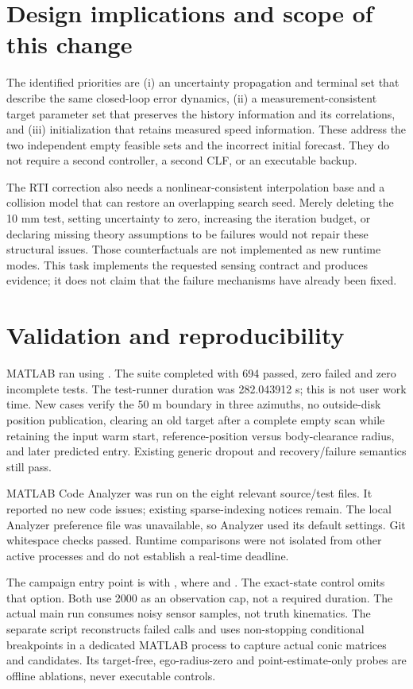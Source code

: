 \documentclass[11pt]{article}
\begin{document}
\section{Design implications and scope of this change}
The identified priorities are (i) an uncertainty propagation and terminal set
that describe the same closed-loop error dynamics, (ii) a measurement-consistent
target parameter set that preserves the history information and its correlations,
and (iii) initialization that retains measured speed information. These address
the two independent empty feasible sets and the incorrect initial forecast.
They do not require a second controller, a second CLF, or an executable backup.

The RTI correction also needs a nonlinear-consistent interpolation base and a
collision model that can restore an overlapping search seed. Merely deleting
the 10 mm test, setting uncertainty to zero, increasing the iteration budget,
or declaring missing theory assumptions to be failures would not repair these
structural issues. Those counterfactuals are not implemented as new runtime modes.
This task implements the requested sensing contract and produces evidence;
it does not claim that the failure mechanisms have already been fixed.

\section{Validation and reproducibility}
MATLAB ran  using
. The suite completed with 694 passed, zero failed and zero incomplete tests. The test-runner
duration was 282.043912 s; this is not user work time. New cases verify the
50 m boundary in three azimuths, no outside-disk position publication, clearing
an old target after a complete empty scan while retaining the input warm start,
reference-position versus body-clearance radius, and later predicted entry.
Existing generic dropout and recovery/failure semantics still pass.

MATLAB Code Analyzer was run on the eight relevant source/test files. It
reported no new code issues; existing sparse-indexing notices remain. The local
Analyzer preference file was unavailable, so Analyzer used its default settings.
Git whitespace checks passed. Runtime comparisons were not isolated from other
active processes and do not establish a real-time deadline.

The campaign entry point is  with
, where
 and
. The exact-state control omits that option.
Both use 2000 as an observation cap, not a required duration. The actual main
run consumes noisy sensor samples, not truth kinematics. The separate script
 reconstructs failed calls and
uses non-stopping conditional breakpoints in a dedicated MATLAB process to
capture actual conic matrices and candidates. Its target-free, ego-radius-zero
and point-estimate-only probes are offline ablations, never executable controls.
\end{document}

